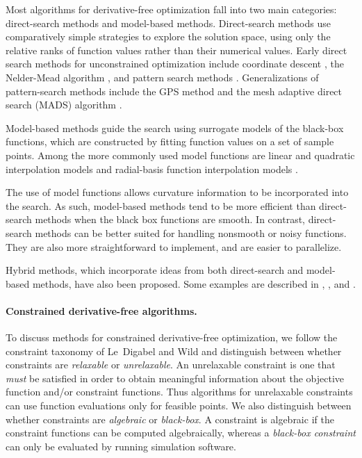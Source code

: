 Most  algorithms for derivative-free optimization fall into two main categories: direct-search methods and model-based methods.   Direct-search methods use comparatively simple strategies to explore the solution space, using only the relative ranks of function values rather than their numerical values.     Early direct search methods for unconstrained optimization include coordinate descent \cite{fermi.metropolis:numerical},  the Nelder-Mead algorithm \cite{10.1093/comjnl/7.4.308},  
and pattern search methods \cite {hooke.jeeves:direct, kolda.lewis.ea:optimization}.   Generalizations of pattern-search methods include the GPS method \cite{torczon:convergence, Audet2002AnalysisOG} and the mesh adaptive direct search (MADS) algorithm \cite{audet.dennis:mesh, abramson.audet:convergence}.

Model-based methods guide the search using surrogate models of the black-box functions, which are constructed by fitting function values on a set of sample points.    Among the more commonly used model functions are linear and quadratic interpolation models \cite{ conn.scheinberg.ea:recent, powell:uobyqa,powell:newuoa}  and radial-basis function interpolation models \cite{oeuvray.bierlaire:boosters,wild.regis.ea:orbit,wild.shoemaker:global}.

The use of model functions allows curvature information to be incorporated into the search.  As such, model-based methods tend to be more efficient than direct-search methods when the black box functions are smooth.  In contrast, direct-search methods can be better suited for handling nonsmooth or noisy functions.   They are also more straightforward to implement, and are easier to parallelize.

Hybrid methods, which incorporate ideas from both direct-search and model-based methods, have also been proposed.    Some examples are described in \cite{booker.dennis.ea:rigorous}, \cite{thi.vaz.ea:optimizing}, and \cite{custodio.vicente:using}.

\paragraph*{Constrained derivative-free algorithms.}
To discuss methods for constrained derivative-free optimization,  we follow the constraint taxonomy      
of Le~Digabel and Wild \cite{ledigabel2015taxonomy} and distinguish between whether constraints are {\em relaxable} or {\em unrelaxable}.    An unrelaxable constraint is one that {\em must} be satisfied in order to obtain meaningful information about the objective function and/or constraint functions.    Thus algorithms for unrelaxable constraints can use function evaluations only for feasible points.   We also distinguish between whether constraints are {\em algebraic} or {\em black-box}.    A constraint is algebraic if the constraint functions can be computed algebraically,  whereas a {\em black-box constraint} can only be evaluated by running simulation software.    


